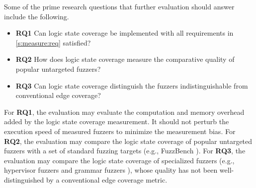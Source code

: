 \documentclass[letterpaper,twocolumn,10pt]{article}
\begin{document}
Some of the prime research questions that further evaluation should answer
include the following.

\begin{itemize}
  \item \textbf{RQ1} Can logic state coverage be implemented with all
    requirements in \autoref{s:measure:req} satisfied?
  \item \textbf{RQ2} How does logic state coverage measure the comparative
    quality of popular untargeted fuzzers?
  \item \textbf{RQ3} Can logic state coverage distinguish the fuzzers
    indistinguishable from conventional edge coverage?
\end{itemize}

For \textbf{RQ1}, the evaluation may evaluate the computation and memory
overhead added by the logic state coverage measurement. It should not perturb
the execution speed of measured fuzzers to minimize the measurement bias. For
\textbf{RQ2}, the evaluation may compare the logic state coverage of popular
untargeted fuzzers \cite{afl,fioraldi2020aflpp,libfuzzer,honggfuzz} with a
set of standard fuzzing targets (e.g., FuzzBench \cite{metzman2021fuzzbench}).
For \textbf{RQ3}, the evaluation may compare the logic state coverage of
specialized fuzzers (e.g., hypervisor fuzzers
\cite{liu2023videzzo,myung2022mundofuzz,sergej2021nyx,schumilo2020hypercube} and
grammar fuzzers
\cite{wang2023fuzzjit,wu2023jitfuzz,gross2023fuzzilli,srivastava2021gramatron,chen2021polyglot}),
whose quality has not been well-distinguished by a conventional edge coverage
metric.

\end{document}
